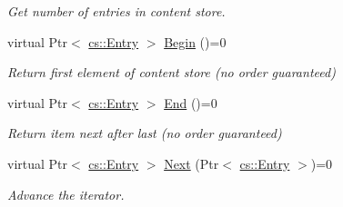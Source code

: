\begin{DoxyCompactItemize}
\begin{DoxyCompactList}\small\item\em Get number of entries in content store. \end{DoxyCompactList}\item 
virtual Ptr$<$ \hyperlink{classns3_1_1ndn_1_1cs_1_1Entry}{cs\+::\+Entry} $>$ \hyperlink{classns3_1_1ndn_1_1ContentStore_ac40f362b20660e8ed128926319d0f5b2}{Begin} ()=0\hypertarget{classns3_1_1ndn_1_1ContentStore_ac40f362b20660e8ed128926319d0f5b2}{}\label{classns3_1_1ndn_1_1ContentStore_ac40f362b20660e8ed128926319d0f5b2}

\begin{DoxyCompactList}\small\item\em Return first element of content store (no order guaranteed) \end{DoxyCompactList}\item 
virtual Ptr$<$ \hyperlink{classns3_1_1ndn_1_1cs_1_1Entry}{cs\+::\+Entry} $>$ \hyperlink{classns3_1_1ndn_1_1ContentStore_a594d2a548898ef462808a9cbb314c387}{End} ()=0\hypertarget{classns3_1_1ndn_1_1ContentStore_a594d2a548898ef462808a9cbb314c387}{}\label{classns3_1_1ndn_1_1ContentStore_a594d2a548898ef462808a9cbb314c387}

\begin{DoxyCompactList}\small\item\em Return item next after last (no order guaranteed) \end{DoxyCompactList}\item 
virtual Ptr$<$ \hyperlink{classns3_1_1ndn_1_1cs_1_1Entry}{cs\+::\+Entry} $>$ \hyperlink{classns3_1_1ndn_1_1ContentStore_ab0079a0ac5b1efa8d69aeee77c0cac24}{Next} (Ptr$<$ \hyperlink{classns3_1_1ndn_1_1cs_1_1Entry}{cs\+::\+Entry} $>$)=0\hypertarget{classns3_1_1ndn_1_1ContentStore_ab0079a0ac5b1efa8d69aeee77c0cac24}{}\label{classns3_1_1ndn_1_1ContentStore_ab0079a0ac5b1efa8d69aeee77c0cac24}

\begin{DoxyCompactList}\small\item\em Advance the iterator. \end{DoxyCompactList}\end{DoxyCompactItemize}
